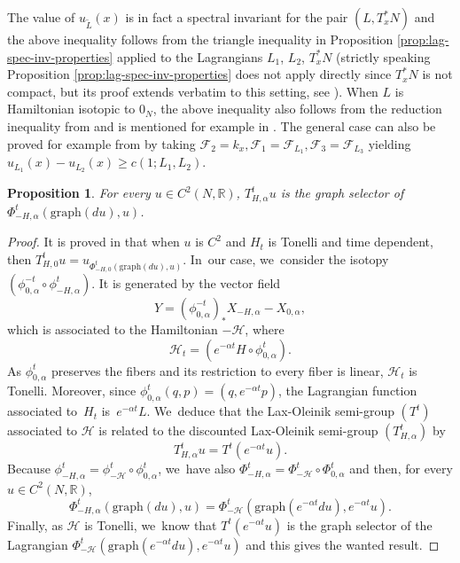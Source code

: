 \documentclass[10pt]{amsart}
\newtheorem{prop}[thm]{Proposition}
\theoremstyle{definition}
\newcommand{\Hh}{{\mathcal H}}
\newcommand{\R}{\mathbb{R}}
\begin{document}
The value of $u_{\tilde{L}}(x)$ is in fact a spectral invariant for the pair $(L,T_x^*N)$ and the above inequality follows from the triangle inequality in Proposition \ref{prop:lag-spec-inv-properties} applied to the Lagrangians $L_1$, $L_2$, $T_x^*N$ (strictly speaking Proposition \ref{prop:lag-spec-inv-properties} does not apply directly since $T_x^*N$ is not compact, but its proof extends verbatim to this setting, see \cite[Th.\,16]{Hum-Lec-Sey3}).
When $L$ is Hamiltonian isotopic to $0_N$, the above inequality also follows from the reduction inequality from \cite{Viterbo-STAGGF} and is mentioned for example in \cite[p.\,263]{Cardin-Viterbo}. The general case can also be proved for example from \cite[Prop.\,8.13]{Vichery-these} by taking
$\mathcal F_2=k_x, {\mathcal F}_1=\mathcal F_{L_1}, {\mathcal F}_3={\mathcal F}_{L_3}$ yielding $u_{L_1}(x)-u_{L_2}(x)\geq c(1;L_1,L_2)$.

\begin{prop}
For every $u\in C^2(N, \R)$, $T_{H, \alpha}^tu$ is the graph selector of $\Phi_{-H, \alpha}^t(\text{graph}(du), u)$.
\end{prop}
\begin{proof}
It is proved in \cite{Roos2019} that when $u$ is $C^2$ and $H_t$ is Tonelli and time dependent, then $T^t_{H, 0}u\!=\!u_{\Phi^t_{-H, 0}(\text{graph}(du), u)}$. In~our case, we~consider the isotopy~\hbox{$(\phi^{-t}_{0, \alpha}\circ \phi_{-H, \alpha}^{t})$}. It is generated by the vector field\vspace*{-3pt}
\[
Y=(\phi_{0,\alpha}^{-t})_* X_{-H,\alpha}-X_{0,\alpha},
\]
which is associated to the Hamiltonian $-\Hh$, where\vspace*{-3pt}
\[
\Hh_t=(e^{-\alpha t}H\circ \phi_{0, \alpha}^{t}).
\]
As $\phi_{0, \alpha}^{t}$ preserves the fibers and its restriction to every fiber is linear, $\Hh_t$ is Tonelli. Moreover, since $\phi_{0,\alpha}^t(q,p)=(q,e^{-\alpha t}p)$, the Lagrangian function associated to~$H_t$ is~$e^{-\alpha t}L$. We~deduce that the Lax-Oleinik semi-group $(T^t)$ associated to $\Hh$ is related to the discounted Lax-Oleinik semi-group $(T^t_{H, \alpha})$ by\vspace*{-3pt}
\[
T_{H, \alpha}^tu=T^t(e^{-\alpha t}u).
\]
Because $\phi_{-H, \alpha}^t =\phi^t_{-\Hh}\circ \phi_{0, \alpha}^t$, we~have also $\Phi_{-H, \alpha}^t =\Phi^t_{-\Hh}\circ \Phi_{0, \alpha}^t$ and then, for every $u\in C^2(N, \R)$,\vspace*{-3pt}
\[
\Phi_{-H, \alpha}^t(\text{graph}(du), u)=\Phi_{-\Hh}^t(\text{graph}(e^{-\alpha t}du), e^{-\alpha t}u).
\]
Finally, as $\Hh$ is Tonelli, we~know that $T^t(e^{-\alpha t}u)$ is the graph selector of the Lagrangian $\Phi_{-\Hh}^t(\text{graph}(e^{-\alpha t}du), e^{-\alpha t}u)$ and this gives the wanted result.
\end{proof}
\end{document}
